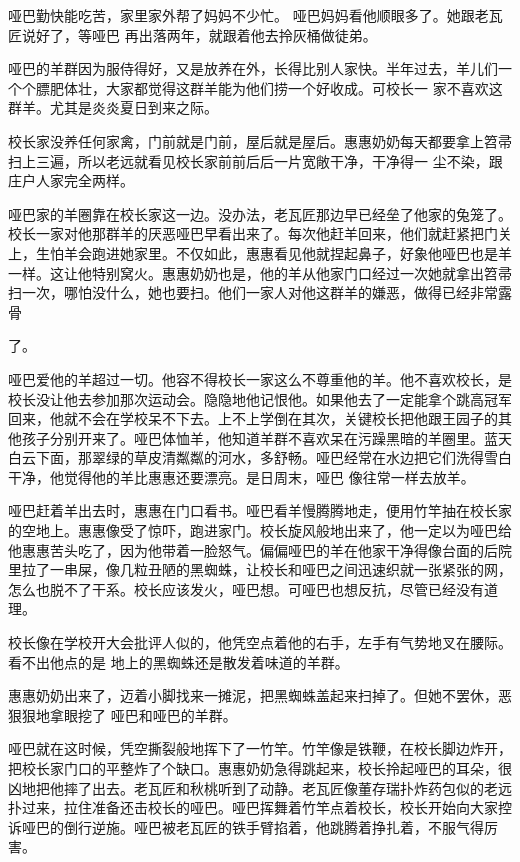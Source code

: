 \documentclass{article}
\begin{document}
哑巴勤快能吃苦，家里家外帮了妈妈不少忙。
\newpage
哑巴妈妈看他顺眼多了。她跟老瓦匠说好了，等哑巴
再出落两年，就跟着他去拎灰桶做徒弟。 

哑巴的羊群因为服侍得好，又是放养在外，长得比别人家快。半年过去，羊儿们一个个膘肥体壮，大家都觉得这群羊能为他们捞一个好收成。可校长一
家不喜欢这群羊。尤其是炎炎夏日到来之际。 

校长家没养任何家禽，门前就是门前，屋后就是屋后。惠惠奶奶每天都要拿上笤帚扫上三遍，所以老远就看见校长家前前后后一片宽敞干净，干净得一
尘不染，跟庄户人家完全两样。 

哑巴家的羊圈靠在校长家这一边。没办法，老瓦匠那边早已经垒了他家的兔笼了。校长一家对他那群羊的厌恶哑巴早看出来了。每次他赶羊回来，他们就赶紧把门关上，生怕羊会跑进她家里。不仅如此，惠惠看见他就捏起鼻子，好象他哑巴也是羊一样。这让他特别窝火。惠惠奶奶也是，他的羊从他家门口经过一次她就拿出笤帚扫一次，哪怕没什么，她也要扫。他们一家人对他这群羊的嫌恶，做得已经非常露骨
\newpage

了。 

哑巴爱他的羊超过一切。他容不得校长一家这么不尊重他的羊。他不喜欢校长，是校长没让他去参加那次运动会。隐隐地他记恨他。如果他去了一定能拿个跳高冠军回来，他就不会在学校呆不下去。上不上学倒在其次，关键校长把他跟王园子的其他孩子分别开来了。哑巴体恤羊，他知道羊群不喜欢呆在污躁黑暗的羊圈里。蓝天白云下面，那翠绿的草皮清粼粼的河水，多舒畅。哑巴经常在水边把它们洗得雪白干净，他觉得他的羊比惠惠还要漂亮。是日周末，哑巴
像往常一样去放羊。 

哑巴赶着羊出去时，惠惠在门口看书。哑巴看羊慢腾腾地走，便用竹竿抽在校长家的空地上。惠惠像受了惊吓，跑进家门。校长旋风般地出来了，他一定以为哑巴给他惠惠苦头吃了，因为他带着一脸怒气。偏偏哑巴的羊在他家干净得像台面的后院里拉了一串屎，像几粒丑陋的黑蜘蛛，让校长和哑巴之间迅速织就一张紧张的网，怎么也脱不了干系。校长应该发火，哑巴想。可哑巴也想反抗，尽管已经没有道理。
\newpage


校长像在学校开大会批评人似的，他凭空点着他的右手，左手有气势地叉在腰际。看不出他点的是
地上的黑蜘蛛还是散发着味道的羊群。 

惠惠奶奶出来了，迈着小脚找来一摊泥，把黑蜘蛛盖起来扫掉了。但她不罢休，恶狠狠地拿眼挖了
哑巴和哑巴的羊群。 

哑巴就在这时候，凭空撕裂般地挥下了一竹竿。竹竿像是铁鞭，在校长脚边炸开，把校长家门口的平整炸了个缺口。惠惠奶奶急得跳起来，校长拎起哑巴的耳朵，很凶地把他摔了出去。老瓦匠和秋桃听到了动静。老瓦匠像董存瑞扑炸药包似的老远扑过来，拉住准备还击校长的哑巴。哑巴挥舞着竹竿点着校长，校长开始向大家控诉哑巴的倒行逆施。哑巴被老瓦匠的铁手臂掐着，他跳腾着挣扎着，不服气得厉害。
\end{document}
